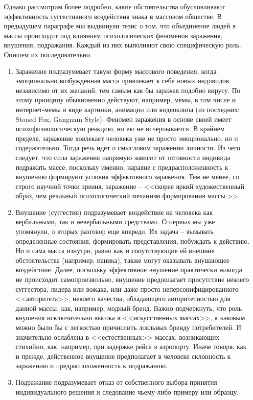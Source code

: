 Однако рассмотрим более подробно, какие обстоятельства обусловливают эффективность
суггестивного воздействия знака в массовом обществе. В предыдущем параграфе мы выдвинули тезис о том, что объединение людей в массы
происходит под влиянием психологических феноменов заражения, внушения, подражания.
Каждый из них выполняют свою специфическую роль. Опишем их последовательно.
\begin{enumerate}
    \item Заражение подразумевает такую форму массового поведения, когда
    эмоционально возбужденная масса привлекает к себе новых индивидов независимо
    от их желаний, тем самым как бы заражая подобно вирусу.
    \autocites{freid_mass}{petrovsky1990}{porshnev1979}{olshansky}
    По этому принципу обыкновенно действуют, например, мемы, в том числе и интернет-мемы в
    виде картинки, анимации или видеоклипа (из последних: Stoned Fox, Gangnam Style). Феномен заражения в
    основе своей имеет психофизиологическую реакцию, но ею не исчерпывается.
    В крайнем пределе, заражение вовлекает человека уже не просто эмоционально,
    но и содержательно. Тогда речь идет о смысловом заражении личности.
    Из чего следует, что сила заражения напрямую зависит от готовности индивида
    подражать массе, поскольку именно, наравне с предрасположенность к внушению
    формируют условия эффективного заражения. Тем не менее, со строго научной точки
    зрения, заражение -- <<скорее яркий художественный образ, чем реальный
    психологический механизм формирования массы.>>\autocite[][86]{olshansky}.

    \item Внушение (суггестия) подразумевает воздействие на человека как вербальными,
    так и невербальными средствами. О первых мы уже упомянули, о вторых разговор еще
    впереди. Их задача -- вызывать определенные состояния, формировать представления,
    побуждать к действию. Но и сама масса изнутри, равно как и сопутствующие ей
    внешние обстоятельства (например, паника), также могут оказывать внушающее
    воздействие\autocites{behterev1898}{porshnev1979}. Далее, поскольку эффективное
    внушение практически никогда не происходит самопроизвольно, внушение предполагает
    присутствие некоего суггестора, лидера или вожака, или даже просто
    неперсонифицированного <<авторитета>>, некоего качества, обладающего
    авторитетностью для данной массы, как, например, модный бренд.
    Важно подчеркнуть, что роль внушения исключительно высока в <<искусственных массах>>\autocite[][69]{freid_mass}, к каковым можно было
    бы с легкостью причислить лояльных бренду потребителей. И значительно
    ослаблена в <<естественных>> массах, возникающих стихийно, как, например,
    при задержке рейса в аэропорту. Иначе говоря, как и прежде, действенное внушение
    предполагает в человеке склонность к заражению и предрасположенность к подражанию.

    \item Подражание подразумевает отказ от собственного выбора принятия
    индивидуального решения и следование чьему-либо примеру или образцу.
\end{enumerate}
